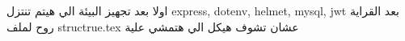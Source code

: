 اولا بعد تجهيز البيئة الي هيتم تنتزل
{ express,
  dotenv,
  helmet,
  mysql,
  jwt
}
بعد القراية روح لملف 
structrue.tex
عشان تشوف هيكل الي هتمشي علية
